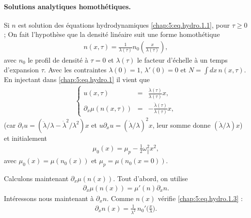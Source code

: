 \paragraph{Solutions analytiques homothétiques.}
Si $n$ est solution des équations hydrodynamiques \eqref{chap:5:eq.hydro.1.1}, pour $\tau \geq 0$; On fait l'hypothèse que la densité linéaire suit une forme homothétique
\begin{eqnarray}\label{chap:5:eq.hydro.1.3}
	n(x,\tau) = \frac{1}{\lambda(\tau)} n_0 \left ( \frac{x}{\lambda(\tau)} \right ) ,	
\end{eqnarray}
avec $n_0$ le profil de densité à $\tau = 0 $ et $\lambda(\tau)$ le facteur d'échelle à un temps d'expansion $\tau$. Avec les contraintes $\lambda(0) = 1$, $\lambda'(0) = 0$ et $N = \int dx \, n(x , \tau ) $. En injectant dans \eqref{chap:5:eq.hydro.1} il vient que 
\begin{eqnarray}\label{chap:5:eq.hydro.2}
	\left\{
	\begin{array}{rcl}
		u(x, \tau ) & = & \displaystyle \frac{\dot\lambda(\tau)}{\lambda(\tau)} x , \\[0.3em]
		\partial_x \mu ( n ( x , \tau ))  & = & - \displaystyle \frac{\ddot\lambda(\tau)}{\lambda(\tau)} x,
	\end{array} 
	\right.
\end{eqnarray}
(car \(\partial_\tau u=(\ddot\lambda/\lambda-\dot\lambda^2/\lambda^2)x\) et \(u\partial_x u=(\dot\lambda/\lambda)^2 x\), leur somme donne \((\ddot\lambda/\lambda)x\)) et initialement%
\begin{eqnarray}
	\mu_0( x ) = \mu_p - \frac{1}{2} \omega_\parallel^2 x^2,	
\end{eqnarray}
avec $\mu_0(x) = \mu( n_0 ( x ) )$ et $\mu_p = \mu( n_0 ( x = 0  ) )$.

\bigskip

Calculons maintenant \(\partial_x\mu(n(x))\). Tout d'abord, on utilise 
\begin{eqnarray}\label{chap:5:eq.hydro.2.1}
	\partial_x\mu(n(x)) = \mu'(n)\partial_x n.
\end{eqnarray}
Intéressons nous maintenant à $\partial_x n$. Comme $n(x)$ vérifie \eqref{chap:5:eq.hydro.1.3} :
\begin{eqnarray}\label{chap:5:eq.hydro.2.2}
	\partial_x n(x)=\frac{1}{\lambda^2}\,n_0'\!\Big(\frac{x}{\lambda}\Big).	
\end{eqnarray}

